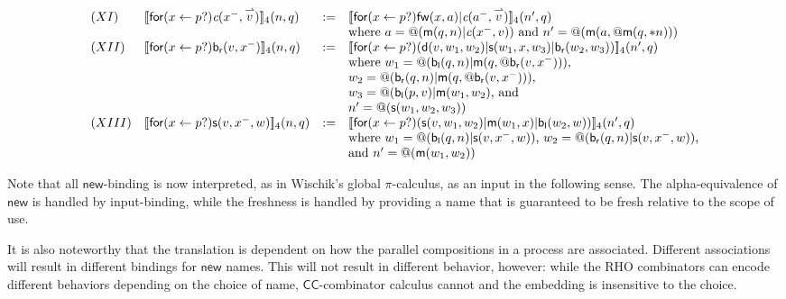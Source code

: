 \documentclass[submission,copyright,creativecommons]{eptcs}
\makeatletter
\newcommand{\new}{\mathsf{new}}
\newcommand{\ccomb}{$\mathsf{CC}$-combinator calculus}
\newcommand{\ldb}{[\![}
\newcommand{\rdb}{]\!]}
\newcommand{\binpar}[2]{#1 | #2}
\newcommand{\prefix}[3]{\mathsf{for}(#2 \leftarrow #1?) #3}
\newcommand{\quotep}[1]{\mathsf{@}#1}
\newcommand{\meaningof}[1]{\ldb #1 \rdb}
\newcommand{\vect}[1]{\stackrel{\rightharpoonup}{#1}}
\theoremstyle{definition}
\theoremstyle{remark}
\theoremstyle{remark}
\makeatother
\begin{document}
\[\begin{array}{llrl}
(XI)&  \meaningof{\prefix{p}{x}{\emph{c}(x^{-},\vect{v})}}_4(n, q) 
    & := & 
    \meaningof{\prefix{p}{x}{\binpar{\mathsf{fw}(x,a)}{\emph{c}(a^{-},\vect{v})}}}_4(n', q)\\
    & & & \mbox{where $a = @(\binpar{\mathsf{m}(q,n)}{\emph{c}(x^{-},v)})$} \mbox{ and $n'= \quotep{(\mathsf{m}(a,\quotep{\mathsf{m}(q,*n)}))}$} \\
(XII)&  \meaningof{\prefix{p}{x}{\mathsf{b}_{\mathsf{r}}(v,x^{-})}}_4(n, q) 
    & := & 
    \meaningof{\prefix{p}{x}{(\binpar{\mathsf{d}(v,w_{1},w_{2})}{\binpar{\mathsf{s}(w_{1},x,w_{3})}{\mathsf{b}_{\mathsf{r}}(w_{2},w_{3})}})}}_{4}(n', q) \\
    & & & \mbox{where $w_{1} = \quotep{(\binpar{\mathsf{b}_{\mathsf{l}}(q,n)}{\mathsf{m}(q,\quotep{\mathsf{b}_{\mathsf{r}}(v,x^{-})})})}$,} \\
    & & & \mbox{$w_{2} = \quotep{(\binpar{\mathsf{b}_{\mathsf{r}}(q,n)}{\mathsf{m}(q,\quotep{\mathsf{b}_{\mathsf{r}}(v,x^{-})})})}$,} \\
    & & & \mbox{$w_{3} = \quotep{(\binpar{\mathsf{b}_{\mathsf{l}}(p,v)}{\mathsf{m}(w_{1},w_{2}})}$, and } \\
    & & & \mbox{$n' = \quotep{(\mathsf{s}(w_{1},w_{2},w_{3}))}$} \\
(XIII)&  \meaningof{\prefix{p}{x}{\mathsf{s}(v,x^{-},w)}}_4(n, q) 
    & := & 
    \meaningof{\prefix{p}{x}{(\binpar{\mathsf{s}(v,w_{1},w_{2})}{\binpar{\mathsf{m}(w_{1},x)}{\mathsf{b}_{\mathsf{l}}(w_{2},w)}})}}_{4}(n', q) \\
    & & & \mbox{where $w_{1} = @(\binpar{\mathsf{b}_{\mathsf{l}}(q,n)}{\mathsf{s}(v,x^{-},w)})$, $w_{2} = @(\binpar{\mathsf{b}_{\mathsf{r}}(q,n)}{\mathsf{s}(v,x^{-},w)})$,} \\
    & & & \mbox{and $n' = \quotep{(\mathsf{m}(w_{1},w_{2}))}$}
\end{array}\]

Note that all $\new$-binding is now interpreted, as in Wischik's
global $\pi$-calculus, as an input \cite{globalpi} in the following
sense. The alpha-equivalence of $\new$ is handled by input-binding,
while the freshness is handled by providing a name that is guaranteed
to be fresh relative to the scope of use.

It is also noteworthy that the translation is dependent on how the
parallel compositions in a process are associated. Different
associations will result in different bindings for $\new$
names. This will not result in different behavior, however:
while the RHO combinators can encode different behaviors depending
on the choice of name, {\ccomb} cannot and the
embedding is insensitive to the choice.
\end{document}
